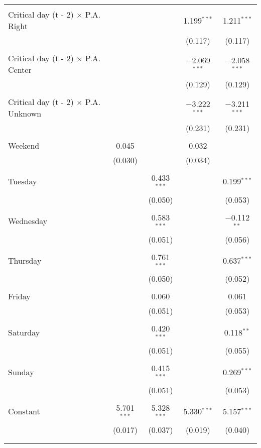 \documentclass[
]{article}
\begin{document}
\begin{table}[!htbp]
{\begin{tabular}{@{\extracolsep{5pt}}lcccc}
  & & & & \\ 
 Critical day (t - 2) $\times$ P.A. Right &  &  & 1.199$^{***}$ & 1.211$^{***}$ \\ 
  &  &  & (0.117) & (0.117) \\ 
  & & & & \\ 
 Critical day (t - 2) $\times$ P.A. Center &  &  & $-$2.069$^{***}$ & $-$2.058$^{***}$ \\ 
  &  &  & (0.129) & (0.129) \\ 
  & & & & \\ 
 Critical day (t - 2) $\times$ P.A. Unknown &  &  & $-$3.222$^{***}$ & $-$3.211$^{***}$ \\ 
  &  &  & (0.231) & (0.231) \\ 
  & & & & \\ 
 Weekend & 0.045 &  & 0.032 &  \\ 
  & (0.030) &  & (0.034) &  \\ 
  & & & & \\ 
 Tuesday &  & 0.433$^{***}$ &  & 0.199$^{***}$ \\ 
  &  & (0.050) &  & (0.053) \\ 
  & & & & \\ 
 Wednesday &  & 0.583$^{***}$ &  & $-$0.112$^{**}$ \\ 
  &  & (0.051) &  & (0.056) \\ 
  & & & & \\ 
 Thursday &  & 0.761$^{***}$ &  & 0.637$^{***}$ \\ 
  &  & (0.050) &  & (0.052) \\ 
  & & & & \\ 
 Friday &  & 0.060 &  & 0.061 \\ 
  &  & (0.051) &  & (0.053) \\ 
  & & & & \\ 
 Saturday &  & 0.420$^{***}$ &  & 0.118$^{**}$ \\ 
  &  & (0.051) &  & (0.055) \\ 
  & & & & \\ 
 Sunday &  & 0.415$^{***}$ &  & 0.269$^{***}$ \\ 
  &  & (0.051) &  & (0.053) \\ 
  & & & & \\ 
 Constant & 5.701$^{***}$ & 5.328$^{***}$ & 5.330$^{***}$ & 5.157$^{***}$ \\ 
  & (0.017) & (0.037) & (0.019) & (0.040) \\ 
  & & & & \\ 
\hline \\[-1.8ex] 

\end{tabular}}
\end{table}
\end{document}
